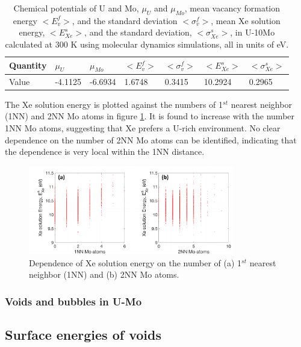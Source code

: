 \documentclass[review]{elsarticle}
\begin{document}
\begin{table}[h!]
\centering
\begin{tabular}{|l|l|l|l|l|l|l|}
\hline
Quantity & $\mu_U$ & $\mu_{Mo}$ & $<E^f_v>$      & $<\sigma^f_v>$      & $<E^s_{Xe}>$       & $<\sigma^s_{Xe}>$      \\ \hline
Value    & -4.1125 & -6.6934     & 1.6748         & 0.3415              & 10.2924           & 0.2965 \\ \hline
\end{tabular}
\caption{Chemical potentials of U and Mo, $\mu_U$ and $\mu_{Mo}$, mean vacancy formation energy $<E^f_v>$, and the standard deviation $<\sigma^f_v>$, mean Xe solution energy, $<E^s_{Xe}>$, and the standard deviation, $<\sigma^s_{Xe}>$, in U-10Mo calculated at 300 K using molecular dynamics simulations, all in units of eV.}\label{Table:EfV}
\end{table}

The Xe solution energy is plotted against the numbers of 1$^{st}$ nearest neighbor (1NN) and 2NN Mo atoms in figure \ref{fig:MoNN}. It is found to increase with the number 1NN Mo atoms, suggesting that Xe prefers a U-rich environment. No clear dependence on the number of 2NN Mo atoms can be identified, indicating that the dependence is very local within the 1NN distance. 

\begin{figure}[h!]
 \centering
 \includegraphics[width=0.8\textwidth]{MoNN.pdf} 
 \caption{Dependence of Xe solution energy on the number of (a) 1$^{st}$ nearest neighbor (1NN) and (b) 2NN Mo atoms.}
 \label{fig:MoNN}
\end{figure}



\FloatBarrier

\subsubsection{Voids and bubbles in U-Mo}

\subsection{Surface energies of voids}
\end{document}
